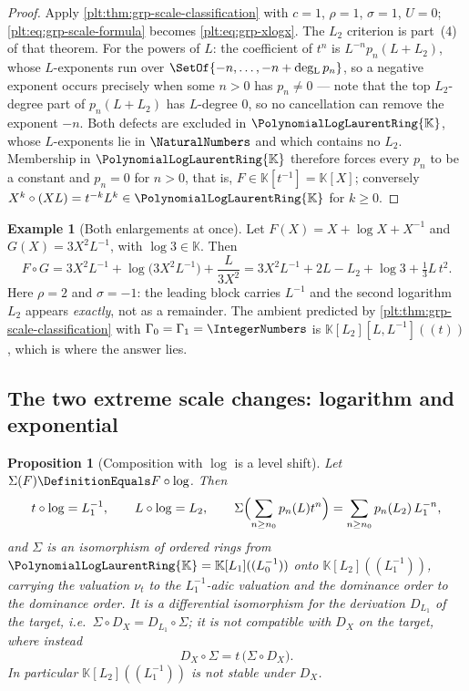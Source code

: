 \documentclass[11pt,oneside]{article}
\theoremstyle{plain}
\newtheorem{proposition}[theorem]{Proposition}
\theoremstyle{definition}
\newtheorem{example}[theorem]{Example}
\theoremstyle{remark}
\newcommand{\K}{\mathbb{K}}
\newcommand{\PLlau}{\PolynomialLogLaurentRing{\K}}       %
\newcommand{\ordt}{\nu_{t}}                              %
\DeclareMathOperator{\degL}{deg_{L}}
\newcommand{\DX}{D_{X}}                                  %
\newcommand{\compose}{\mathbin{\circ}}
\begin{document}
\begin{proof}
Apply \cref{plt:thm:grp-scale-classification} with \(c=1\), \(\rho=1\),
\(\sigma=1\), \(U=0\); \eqref{plt:eq:grp-scale-formula} becomes
\eqref{plt:eq:grp-xlogx}.  The \(L_2\) criterion is part~(4) of that theorem.
For the powers of \(L\): the coefficient of \(t^n\) is
\(L^{-n}p_n(L+L_2)\), whose \(L\)-exponents run over
\(\SetOf{-n,\ldots,-n+\degL p_n}\), so a negative exponent occurs precisely
when some \(n>0\) has \(p_n\ne0\) --- note that the top \(L_2\)-degree part of
\(p_n(L+L_2)\) has \(L\)-degree \(0\), so no cancellation can remove the
exponent \(-n\).  Both defects are excluded in \(\PLlau\), whose
\(L\)-exponents lie in \(\NaturalNumbers\) and which contains no \(L_2\).
Membership in \(\PLlau\) therefore forces every \(p_n\) to be a constant and
\(p_n=0\) for \(n>0\), that is, \(F\in\K[t^{-1}]=\K[X]\); conversely
\(X^{k}\compose(XL)=t^{-k}L^{k}\in\PLlau\) for \(k\ge0\).
\end{proof}

\begin{example}[Both enlargements at once]\label{plt:ex:grp-scale-change}
Let \(F(X)=X+\log X+X^{-1}\) and \(G(X)=3X^{2}L^{-1}\), with \(\log3\in\K\).
Then
\[
  F\compose G
  =3X^{2}L^{-1}+\log\bigl(3X^{2}L^{-1}\bigr)+\frac{L}{3X^{2}}
  =3X^{2}L^{-1}+2L-L_2+\log3+\tfrac13L\,t^{2}.
\]
Here \(\rho=2\) and \(\sigma=-1\): the leading block carries \(L^{-1}\) and the
second logarithm \(L_2\) appears \emph{exactly}, not as a remainder.  The
ambient predicted by \cref{plt:thm:grp-scale-classification} with
\(\Gamma_0=\Gamma_1=\IntegerNumbers\) is \(\K[L_2][L,L^{-1}]((t))\), which is
where the answer lies.
\end{example}


\subsection{The two extreme scale changes: logarithm and exponential}

\begin{proposition}[Composition with \(\log\) is a level shift]
\label{plt:prop:grp-shift}
Let \(\Sigma(F)\DefinitionEquals F\compose\log\).  Then
\[
  t\compose\log=L_1^{-1},
  \qquad
  L\compose\log=L_2,
  \qquad
  \Sigma\Bigl(\sum_{n\ge n_0}p_n(L)t^n\Bigr)
  =\sum_{n\ge n_0}p_n(L_2)\,L_1^{-n},
\]
and \(\Sigma\) is an isomorphism of ordered rings from
\(\PLlau=\K[L_1]((L_0^{-1}))\) onto \(\K[L_2]((L_1^{-1}))\), carrying the
valuation \(\ordt\) to the \(L_1^{-1}\)-adic valuation and the dominance order
to the dominance order.  It is a differential isomorphism for the derivation
\(D_{L_1}\) of the target, i.e.\ \(\Sigma\circ\DX=D_{L_1}\circ\Sigma\); it is
\emph{not} compatible with \(\DX\) on the target, where instead
\begin{equation}\label{plt:eq:grp-shift-derivation}
  \DX\circ\Sigma=t\,\bigl(\Sigma\circ\DX\bigr).
\end{equation}
In particular \(\K[L_2]((L_1^{-1}))\) is not stable under \(\DX\).
\end{proposition}
\end{document}
